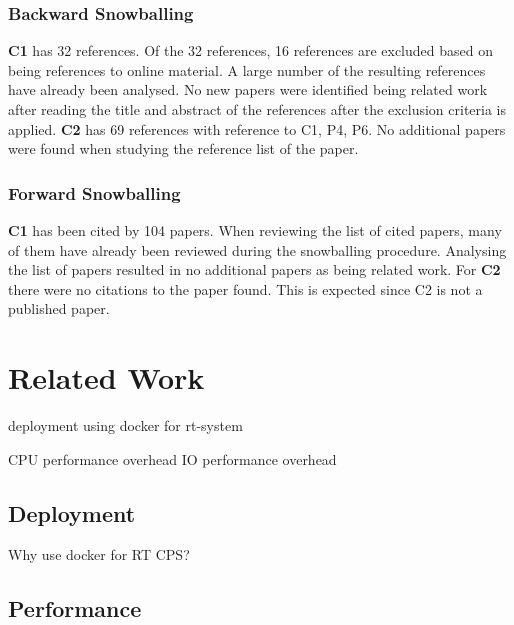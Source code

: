 \subsubsection{Backward Snowballing}
\textbf{C1} has 32 references. Of the 32 references, 16 references are excluded based on being references to online material. A large number of the resulting references have already been analysed. No new papers were identified being related work after reading the title and abstract of the references after the exclusion criteria is applied. \textbf{C2} has 69 references with reference to C1, P4, P6. No additional papers were found when studying the reference list of the paper.

\subsubsection{Forward Snowballing}
\textbf{C1} has been cited by 104 papers. When reviewing the list of cited papers, many of them have already been reviewed during the snowballing procedure.  Analysing the list of papers resulted in no additional papers as being related work. For \textbf{C2} there were no citations to the paper found. This is expected since C2 is not a published paper. 

\section{Related Work}

deployment using docker for rt-system

CPU performance overhead
IO performance overhead 



\subsection{Deployment}


Why use docker for RT CPS?

\subsection{Performance}



